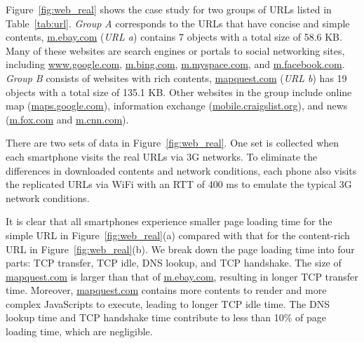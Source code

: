 Figure~\ref{fig:web_real} shows the case study for two groups of
URLs listed in Table~\ref{tab:url}. \emph{Group A} corresponds to 
the URLs that have concise and simple contents, \eg \url{m.ebay.com}
(\emph{URL a}) contains 7 objects with a total size of 58.6 KB.
Many of these websites are search engines or portals to social
networking sites, including \url{www.google.com}, \url{m.bing.com},
\url{m.myspace.com}, and \url{m.facebook.com}. \emph{Group B} 
consists of websites with rich contents, \eg \url{mapquest.com}
(\emph{URL b}) has 19 objects with a total size of 135.1 KB. Other
websites in the group include online map (\url{maps.google.com}), 
information exchange (\url{mobile.craigslist.org}), and news 
(\url{m.fox.com} and \url{m.cnn.com}).

There are two sets of data in Figure~\ref{fig:web_real}. One set is
collected when each smartphone visits the real URLs via 3G networks. 
To eliminate the differences in downloaded contents and network 
conditions, each phone also visits the replicated URLs via WiFi with
an RTT of 400 ms to emulate the typical 3G network conditions.

It is clear that all smartphones experience smaller page loading
time for the simple URL in Figure~\ref{fig:web_real}(a) compared with 
that for the content-rich URL in Figure~\ref{fig:web_real}(b). We 
break down the page loading time into four parts: TCP transfer, 
TCP idle, DNS lookup, and TCP handshake. The size of \url{mapquest.com} 
is larger than that of \url{m.ebay.com}, resulting in longer TCP 
transfer time. Moreover, \url{mapquest.com} contains more contents 
to render and more complex JavaScripts to execute, leading to longer 
TCP idle time. The DNS lookup time and TCP handshake time contribute
to less than 10\% of page loading time, which are negligible.



